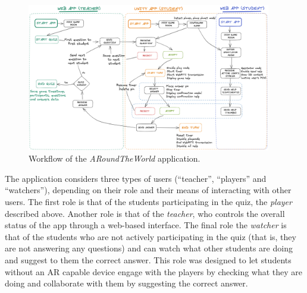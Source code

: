 \documentclass[pdflatex,sn-basic,iicol]{sn-jnl}%
\def\appname/{\textit{ARoundTheWorld}}
\begin{document}
\begin{figure}[htbp]
    \centering
    \includegraphics[width=0.95\textwidth]{imgs/workflow_diagram_3.png}
    \caption{Workflow of the \appname/ application.}
    \label{fig:app_workflow}
\end{figure}



The application considers three types of users (``teacher'', ``players'' and ``watchers''), depending on their role and their means of interacting with other users. The first role is that of the students participating in the quiz, \textendash{} the \textit{player} \textendash{} described above. Another role is that of the \textit{teacher}, who controls the overall status of the app through a web-based interface. The final role \textendash{} the \textit{watcher} \textendash{} is that of the students who are not actively participating in the quiz (that is, they are not answering any questions) and can watch what other students are doing and suggest to them the correct answer. This role was designed to let students without an AR capable device engage with the players by checking what they are doing and collaborate with them by suggesting the correct answer.
\end{document}
